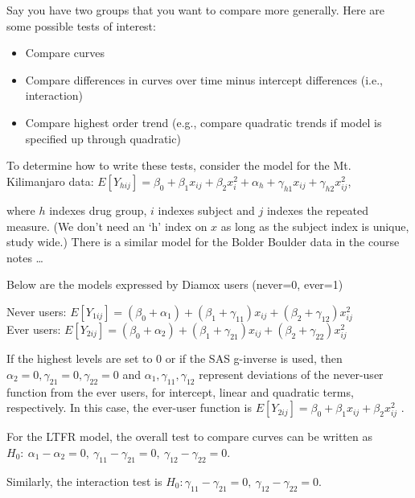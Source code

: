 \documentclass[
  9pt,
  ignorenonframetext,
]{beamer}
\begin{document}
\begin{frame}{}
\protect\hypertarget{section-10}{}
Say you have two groups that you want to compare more generally. Here
are some possible tests of interest:

\begin{itemize}
\item
  Compare curves
\item
  Compare differences in curves over time minus intercept differences
  (i.e., interaction)
\item
  Compare highest order trend (e.g., compare quadratic trends if model
  is specified up through quadratic)
\end{itemize}

To determine how to write these tests, consider the model for the Mt.
Kilimanjaro data:
\(E[Y_{hij}]= \beta_0+ \beta_1 x_{ij}+ \beta_2 x_i^2+\alpha _h+\gamma _{h1} x_{ij}+\gamma _{h2} x_{ij}^2\),

where \(h\) indexes drug group, \(i\) indexes subject and \(j\) indexes
the repeated measure. (We don't need an `h' index on \(x\) as long as
the subject index is unique, study wide.) There is a similar model for
the Bolder Boulder data in the course notes \ldots{}
\end{frame}

\begin{frame}{}
\protect\hypertarget{section-11}{}
Below are the models expressed by Diamox users (never=0, ever=1)

Never users:
\(E[Y_{1ij}]=( \beta_0+\alpha _1)+( \beta_1+\gamma_{11})x_{ij}+( \beta_2+\gamma _{12})x_{ij}^2\)\\
Ever users:
\(E[Y_{2ij}]=( \beta_0+\alpha _2)+( \beta_1+\gamma_{21})x_{ij}+( \beta_2+\gamma _{22})x_{ij}^2\)

If the highest levels are set to 0 or if the SAS g-inverse is used,
then\\
\(\alpha _2=0,\gamma _{21} =0,\gamma _{22} =0\) and
\(\alpha _1,\gamma _{11} ,\gamma _{12}\) represent deviations of the
never-user function from the ever users, for intercept, linear and
quadratic terms, respectively. In this case, the ever-user function is
\(E[Y_{2ij}]= \beta_0+ \beta_1 x_{ij}+ \beta_2 x_{ij}^2\) .

For the LTFR model, the overall test to compare curves can be written as
\(H_0:\ \alpha _1-\alpha _2=0,\ \gamma _{11} -\gamma _{21} =0,\ \gamma _{12} -\gamma _{22} =0\).

Similarly, the interaction test is
\(H_0: \gamma _{11} -\gamma _{21} =0,\ \gamma _{12} -\gamma _{22} =0\).
\end{frame}
\end{document}

